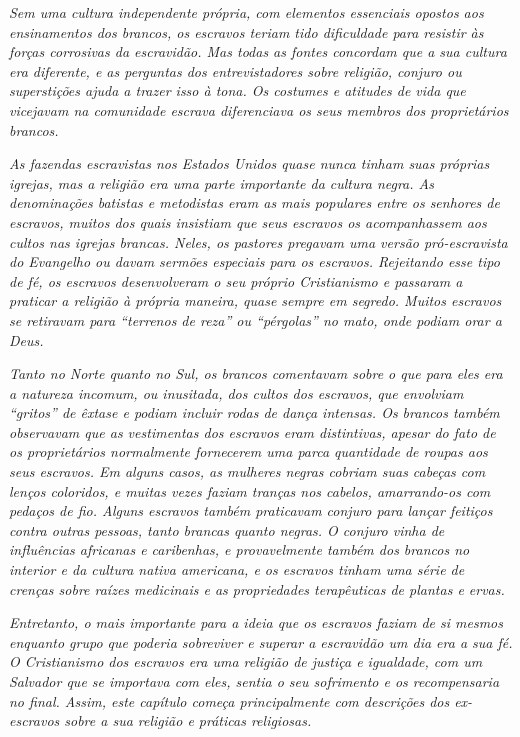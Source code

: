 \emph{Sem uma cultura independente própria, com elementos essenciais
opostos aos ensinamentos dos brancos, os escravos teriam tido
dificuldade para resistir às forças corrosivas da escravidão. Mas todas
as fontes concordam que a sua cultura era diferente, e as perguntas dos
entrevistadores sobre religião, conjuro ou superstições ajuda a trazer
isso à tona. Os costumes e atitudes de vida que vicejavam na comunidade
escrava diferenciava os seus membros dos proprietários brancos. }

\emph{As fazendas escravistas nos Estados Unidos quase nunca tinham suas
próprias igrejas, mas a religião era uma parte importante da cultura
negra. As denominações batistas e metodistas eram as mais populares
entre os senhores de escravos, muitos dos quais insistiam que seus
escravos os acompanhassem aos cultos nas igrejas brancas. Neles, os
pastores pregavam uma versão pró-escravista do Evangelho ou davam
sermões especiais para os escravos. Rejeitando esse tipo de fé, os
escravos desenvolveram o seu próprio Cristianismo e passaram a praticar
a religião à própria maneira, quase sempre em segredo. Muitos escravos
se retiravam para ``terrenos de reza'' ou ``pérgolas'' no mato, onde
podiam orar a Deus. }

\emph{Tanto no Norte quanto no Sul, os brancos comentavam sobre o que
para eles era a natureza incomum, ou inusitada, dos cultos dos escravos,
que envolviam ``gritos'' de êxtase e podiam incluir rodas de dança
intensas. Os brancos também observavam que as vestimentas dos escravos
eram distintivas, apesar do fato de os proprietários normalmente
fornecerem uma parca quantidade de roupas aos seus escravos. Em alguns
casos, as mulheres negras cobriam suas cabeças com lenços coloridos, e
muitas vezes faziam tranças nos cabelos, amarrando-os com pedaços de
fio. Alguns escravos também praticavam conjuro para lançar feitiços
contra outras pessoas, tanto brancas quanto negras. O conjuro vinha de
influências africanas e caribenhas, e provavelmente também dos brancos
no interior e da cultura nativa americana, e os escravos tinham uma
série de crenças sobre raízes medicinais e as propriedades terapêuticas
de plantas e ervas.}

\emph{Entretanto, o mais importante para a ideia que os escravos faziam
de si mesmos enquanto grupo que poderia sobreviver e superar a
escravidão um dia era a sua fé. O Cristianismo dos escravos era uma
religião de justiça e igualdade, com um Salvador que se importava com
eles, sentia o seu sofrimento e os recompensaria no final. Assim, este
capítulo começa principalmente com descrições dos ex-escravos sobre a
sua religião e práticas religiosas.}

